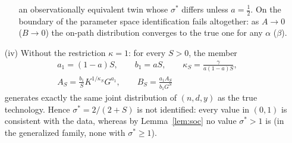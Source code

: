 \begin{proposition}
\begin{enumerate}
\begin{enumerate}
an observationally equivalent twin whose $\sigma^*$ differs unless $a=\tfrac12$. On the boundary of the parameter space
identification fails altogether: as $A\to0$ ($B\to0$) the on-path distribution converges to the true one for any
$\alpha$ ($\beta$).
\end{enumerate}
\item[(iv)] Without the restriction $\kappa=1$: for every $S>0$, the member
\begin{equation}\label{eq:A-family}
\begin{gathered}
a_1=(1-a)S,\qquad b_1=aS,\qquad \kappa_S=\frac{\gamma}{a(1-a)S},\\
A_S=\frac{b_1}{S}K^{1/\kappa_S}G^{a_1},\qquad B_S=\frac{a_1A_S}{b_1G^{S}}
\end{gathered}
\end{equation}
generates exactly the same joint distribution of $(n,d,y)$ as the true technology. Hence $\sigma^*=2/(2+S)$ is not
identified: every value in $(0,1)$ is consistent with the data, whereas by Lemma~\ref{lem:soc} no value $\sigma^*>1$ is (in the
generalized family, none with $\sigma^*\ge1$).
\end{enumerate}
\end{proposition}

